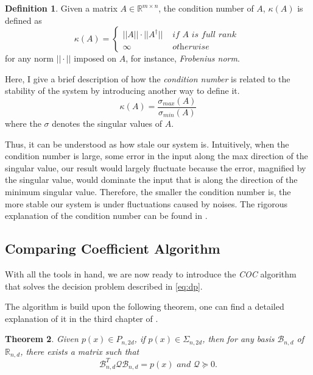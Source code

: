 \documentclass[12pt]{amsart}
\numberwithin{equation}{section}
\newtheorem{thm}{Theorem}
\theoremstyle{definition}
\newtheorem{definition}[thm]{Definition}
\numberwithin{thm}{section}
\begin{document}
\begin{definition}
     \label{def:COND}
     Given a matrix $A \in \mathbb{R}^{m \times n}$, the condition number of $A$, $\kappa(A)$ is defined as
     \begin{equation*}
          \kappa(A) = \begin{cases}
                ||A|| \cdot ||A^\dagger|| & \textit{ if } A \textit{ is full rank } \\
                \infty & \textit{ otherwise }
          \end{cases}
     \end{equation*}
     for any norm $|| \cdot ||$ imposed on $A$, for instance, \emph{Frobenius norm}.
\end{definition}

Here, I give a brief description of how the \emph{condition number} is related to the stability of the system by introducing another way to define it.
\begin{equation*}
     \kappa(A) = \frac{\sigma_{max} (A)}{\sigma_{min} (A)}
\end{equation*}
where the $\sigma$ denotes the singular values of $A$.

Thus, it can be understood as how stale our system is. 
Intuitively, when the condition number is large, some error in the input along the max direction of the singular value,
our result would largely fluctuate because the error, magnified by the singular value, would dominate the input that is along
the direction of the minimum singular value. 
Therefore, the smaller the condition number is, the more stable our system is under fluctuations caused by noises.
The rigorous explanation of the condition number can be found in \cite{Cheney:Kincaid}.

\subsection{Comparing Coefficient Algorithm}
With all the tools in hand, we are now ready to introduce the \emph{COC} algorithm that solves the 
decision problem described in \eqref{eq:dp}.

The algorithm is build upon the following theorem, one can find a detailed explanation of it in the third chapter of \cite{Blekherman:Parrilo:Thomas}.
\begin{thm}
     \label{thm:key}
     Given $p(x) \in P_{n, 2d}$, if $p(x) \in \Sigma_{n, 2d}$, then for any basis $\mathcal{B}_{n, d}$ of $\mathbb{R}_{n, d}$, 
     there exists a matrix such that
     \begin{equation}
          \mathcal{B}_{n, d} ^ T \mathcal{Q} \mathcal{B}_{n, d} = p(x) \textit{ and } \mathcal{Q} \succcurlyeq 0 \label{eq:2-4}.
     \end{equation}
\end{thm}
\end{document}

